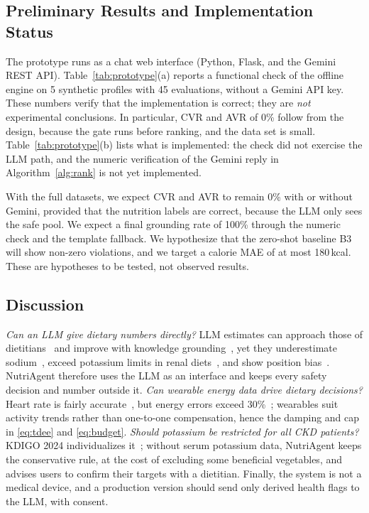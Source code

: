 

\subsection{Preliminary Results and Implementation Status}
The prototype runs as a chat web interface (Python, Flask, and the Gemini REST
API). Table~\ref{tab:prototype}(a) reports a functional check of the offline
engine on 5 synthetic profiles with 45 evaluations, without a Gemini API key.
These numbers verify that the implementation is correct; they are \emph{not}
experimental conclusions. In particular, CVR and AVR of 0\% follow from the
design, because the gate runs before ranking, and the data set is small.
Table~\ref{tab:prototype}(b) lists what is implemented: the check did not
exercise the LLM path, and the numeric verification of the Gemini reply in
Algorithm~\ref{alg:rank} is not yet implemented.



With the full datasets, we expect CVR and AVR to remain 0\% with or without
Gemini, provided that the nutrition labels are correct, because the LLM only
sees the safe pool. We expect a final grounding rate of 100\% through the numeric check and the
template fallback. We hypothesize that the zero-shot
baseline B3 will show non-zero violations, and we target a calorie MAE of at
most 180\,kcal. These are hypotheses to be tested, not observed results.

\subsection{Discussion}
\emph{Can an LLM give dietary numbers directly?} LLM estimates can approach
those of dietitians~\cite{dhaliwal2025nutribench} and improve with knowledge
grounding~\cite{mohbat2025kerl}, yet they underestimate
sodium~\cite{hsuan2025mealbox}, exceed potassium limits in renal
diets~\cite{aydincil2026renal}, and show position bias~\cite{hou2024llmrank}.
NutriAgent therefore uses the LLM as an interface and keeps every safety
decision and number outside it.
\emph{Can wearable energy data drive dietary decisions?} Heart rate is fairly
accurate~\cite{shcherbina2017wrist}, but energy errors exceed
30\%~\cite{germini2022wearable}; wearables suit activity trends rather than
one-to-one compensation, hence the damping and cap in \eqref{eq:tdee} and
\eqref{eq:budget}.
\emph{Should potassium be restricted for all CKD patients?} KDIGO 2024
individualizes it~\cite{kdigo2024ckd}; without serum potassium data, NutriAgent
keeps the conservative rule, at the cost of excluding some beneficial
vegetables, and advises users to confirm their targets with a dietitian.
Finally, the system is not a medical device, and a production version should
send only derived health flags to the LLM, with consent.
